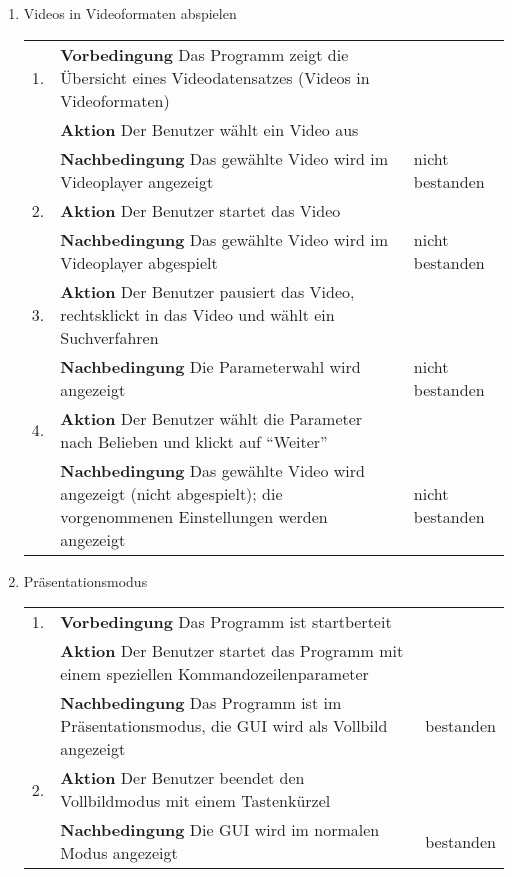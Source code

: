 \begin{enumerate} [label=\bfseries /TSW \arabic*0/, leftmargin=*]
	\item Videos in Videoformaten abspielen \newline \newline
	\begin{tabular}{rp{4in}|l}
	1. & \textbf{Vorbedingung} Das Programm zeigt die Übersicht eines Videodatensatzes (Videos in Videoformaten) & \\
	   & \textbf{Aktion} Der Benutzer wählt ein Video aus & \\
	   & \textbf{Nachbedingung} Das gewählte Video wird im Videoplayer angezeigt & nicht bestanden \\
	\hline
	2. & \textbf{Aktion} Der Benutzer startet das Video & \\
	   & \textbf{Nachbedingung} Das gewählte Video wird im Videoplayer abgespielt & nicht bestanden \\
	\hline
	3. & \textbf{Aktion} Der Benutzer pausiert das Video, rechtsklickt in das Video und wählt ein Suchverfahren & \\
	   & \textbf{Nachbedingung} Die Parameterwahl wird angezeigt & nicht bestanden \\
	\hline
	4. & \textbf{Aktion} Der Benutzer wählt die Parameter nach Belieben und klickt auf \enquote{Weiter} & \\
	   & \textbf{Nachbedingung} Das gewählte Video wird angezeigt (nicht abgespielt); die vorgenommenen Einstellungen werden angezeigt & nicht bestanden \\
	\end{tabular}
	\pagebreak

	\item Präsentationsmodus \newline \newline
	\begin{tabular}{rp{4in}|l}
	1. & \textbf{Vorbedingung} Das Programm ist startberteit & \\
	   & \textbf{Aktion} Der Benutzer startet das Programm mit einem speziellen Kommandozeilenparameter & \\
	   & \textbf{Nachbedingung} Das Programm ist im Präsentationsmodus, die GUI wird als Vollbild angezeigt & bestanden \\
	\hline
	2. & \textbf{Aktion} Der Benutzer beendet den Vollbildmodus mit einem Tastenkürzel & \\
	   & \textbf{Nachbedingung}	Die GUI wird im normalen Modus angezeigt & bestanden \\
	\end{tabular}
	\newline


\end{enumerate}
